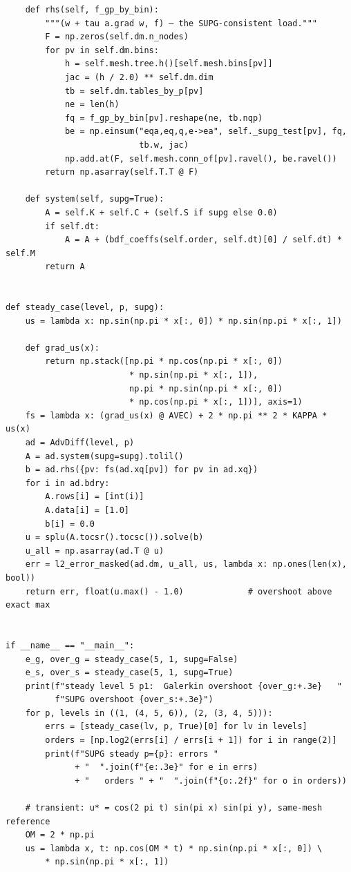 \begin{lstlisting}
    def rhs(self, f_gp_by_bin):
        """(w + tau a.grad w, f) — the SUPG-consistent load."""
        F = np.zeros(self.dm.n_nodes)
        for pv in self.dm.bins:
            h = self.mesh.tree.h()[self.mesh.bins[pv]]
            jac = (h / 2.0) ** self.dm.dim
            tb = self.dm.tables_by_p[pv]
            ne = len(h)
            fq = f_gp_by_bin[pv].reshape(ne, tb.nqp)
            be = np.einsum("eqa,eq,q,e->ea", self._supg_test[pv], fq,
                           tb.w, jac)
            np.add.at(F, self.mesh.conn_of[pv].ravel(), be.ravel())
        return np.asarray(self.T.T @ F)

    def system(self, supg=True):
        A = self.K + self.C + (self.S if supg else 0.0)
        if self.dt:
            A = A + (bdf_coeffs(self.order, self.dt)[0] / self.dt) * self.M
        return A


def steady_case(level, p, supg):
    us = lambda x: np.sin(np.pi * x[:, 0]) * np.sin(np.pi * x[:, 1])

    def grad_us(x):
        return np.stack([np.pi * np.cos(np.pi * x[:, 0])
                         * np.sin(np.pi * x[:, 1]),
                         np.pi * np.sin(np.pi * x[:, 0])
                         * np.cos(np.pi * x[:, 1])], axis=1)
    fs = lambda x: (grad_us(x) @ AVEC) + 2 * np.pi ** 2 * KAPPA * us(x)
    ad = AdvDiff(level, p)
    A = ad.system(supg=supg).tolil()
    b = ad.rhs({pv: fs(ad.xq[pv]) for pv in ad.xq})
    for i in ad.bdry:
        A.rows[i] = [int(i)]
        A.data[i] = [1.0]
        b[i] = 0.0
    u = splu(A.tocsr().tocsc()).solve(b)
    u_all = np.asarray(ad.T @ u)
    err = l2_error_masked(ad.dm, u_all, us, lambda x: np.ones(len(x), bool))
    return err, float(u.max() - 1.0)             # overshoot above exact max


if __name__ == "__main__":
    e_g, over_g = steady_case(5, 1, supg=False)
    e_s, over_s = steady_case(5, 1, supg=True)
    print(f"steady level 5 p1:  Galerkin overshoot {over_g:+.3e}   "
          f"SUPG overshoot {over_s:+.3e}")
    for p, levels in ((1, (4, 5, 6)), (2, (3, 4, 5))):
        errs = [steady_case(lv, p, True)[0] for lv in levels]
        orders = [np.log2(errs[i] / errs[i + 1]) for i in range(2)]
        print(f"SUPG steady p={p}: errors "
              + "  ".join(f"{e:.3e}" for e in errs)
              + "   orders " + "  ".join(f"{o:.2f}" for o in orders))

    # transient: u* = cos(2 pi t) sin(pi x) sin(pi y), same-mesh reference
    OM = 2 * np.pi
    us = lambda x, t: np.cos(OM * t) * np.sin(np.pi * x[:, 0]) \
        * np.sin(np.pi * x[:, 1])


\end{lstlisting}
